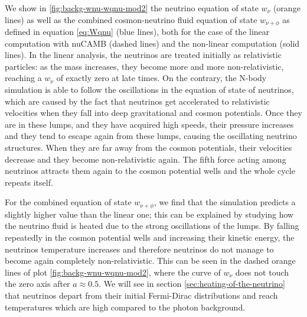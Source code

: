 We show in \cref{fig:backg-wnu-wqnu-mod2} the neutrino equation
of state $w_{\nu}$ (orange lines) as well as the combined cosmon-neutrino
fluid equation of state $w_{\nu+\phi}$ as defined in equation \ref{eq:Wqnu}
(blue lines), both for the case of the linear computation with nuCAMB
(dashed lines) and the non-linear computation (solid lines). In the
linear analysis, the neutrinos are treated initially as relativistic
particles: as the mass increases, they become more and more non-relativistic,
reaching a $w_{\nu}$ of exactly zero at late times. On the contrary,
the N-body simulation is able to follow the oscillations in the equation
of state of neutrinos, which are caused by the fact that neutrinos
get accelerated to relativistic velocities when they fall into deep
gravitational and cosmon potentials. Once they are in these lumps,
and they have acquired high speeds, their pressure increases and they
tend to escape again from these lumps, causing the oscillating neutrino
structures. When they are far away from the cosmon potentials, their
velocities decrease and they become non-relativistic again. The fifth
force acting among neutrinos attracts them again to the cosmon potential
wells and the whole cycle repeats itself.

For the combined equation of state $w_{\nu+\phi}$, we find that the
simulation predicts a slightly higher value than the linear one; this
can be explained by studying how the neutrino fluid is heated due
to the strong oscillations of the lumps. By falling repeatedly in
the cosmon potential wells and increasing their kinetic energy, the
neutrinos temperature increases and therefore neutrinos do not manage
to become again completely non-relativistic. This can be seen in the
dashed orange lines of plot \ref{fig:backg-wnu-wqnu-mod2}, where
the curve of $w_{\nu}$ does not touch the zero axis after $a\approx0.5$.
We will see in section \ref{sec:heating-of-the-neutrino} that neutrinos
depart from their initial Fermi-Dirac distributions and reach temperatures
which are high compared to the photon background.


